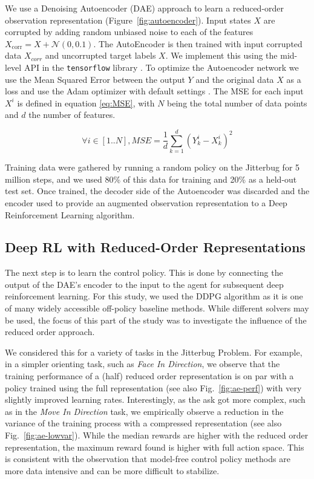 \documentclass{article}
\begin{document}
We use a Denoising Autoencoder (DAE) approach to learn a reduced-order observation representation (Figure~\ref{fig:autoencoder}).
Input states $X$ are corrupted by adding random unbiased noise to each of the features $X_\text{corr} = X + \mathcal{N}(0, 0.1)$.
The AutoEncoder is then trained with input corrupted data $X_{corr}$ and uncorrupted target labels $X$.
We implement this using the mid-level API in the \texttt{tensorflow} library \cite{Abadi2015Tensorflow}.
To optimize the Autoencoder network we use the Mean Squared Error between the output $Y$ and the original data $X$ as a loss and use the Adam optimizer with default settings \cite{Adam}.
The MSE for each input $X^i$ is defined in equation \ref{eq:MSE}, with $N$ being the total number of data points and $d$ the number of features.

\begin{equation}
\forall i \in [1..N], MSE = \frac{1}{d} \sum_{k=1}^d(Y_{k}^i - X_{k}^i)^2
\label{eq:MSE}
\end{equation}

Training data were gathered by running a random policy on the Jitterbug for 5 million steps, and we used 80\% of this data for training and 20\% as a held-out test set.
Once trained, the decoder side of the Autoencoder was discarded and the encoder used to provide an augmented observation representation to a Deep Reinforcement Learning algorithm.

\subsection{Deep RL with Reduced-Order Representations}

The next step is to learn the control policy.
This is done by connecting the output of the DAE's encoder to the input to the agent for subsequent deep reinforcement learning.
For this study, we used the DDPG algorithm as it is one of many  widely accessible off-policy baseline methods.
While different solvers may be used, the focus of this part of the study was to investigate the influence of the reduced order approach.  

We considered this for a variety of tasks in the Jitterbug Problem.
For example, in a simpler orienting task, such as \emph{Face In Direction}, we observe that the training performance of a (half) reduced order representation is on par with a policy trained using the full representation (see also Fig.~\ref{fig:ae-perf}) with very slightly improved learning rates.
Interestingly, as the ask got more complex, such as in the \emph{Move In Direction} task, we empirically observe a reduction in the variance of the training process with a compressed representation (see also Fig.~\ref{fig:ae-lowvar}).
While the median rewards are higher with the reduced order representation, the maximum reward found is higher with full action space.
This is consistent with the observation that model-free control policy methods are more data intensive and can be more difficult to stabilize.  
\end{document}
